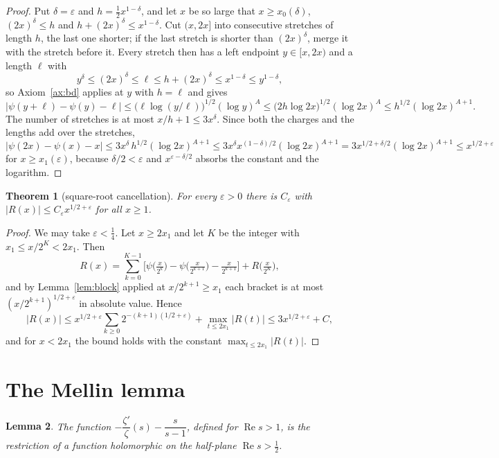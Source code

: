\documentclass[11pt]{article}
\newtheorem{theorem}{Theorem}[section]
\newtheorem{lemma}[theorem]{Lemma}
\theoremstyle{definition}
\theoremstyle{remark}
\newcommand{\Ree}{\operatorname{Re}}
\newcommand{\ps}{\psi}
\begin{document}
\begin{proof}
Put $\delta=\varepsilon$ and $h=\tfrac12x^{1-\delta}$, and let $x$ be so large that $x\ge x_0(\delta)$, $(2x)^{\delta}\le h$ and $h+(2x)^\delta\le x^{1-\delta}$. Cut $(x,2x]$ into consecutive stretches of length $h$, the last one shorter; if the last stretch is shorter than $(2x)^{\delta}$, merge it with the stretch before it. Every stretch then has a left endpoint $y\in[x,2x)$ and a length $\ell$ with
\[
y^{\delta}\le(2x)^{\delta}\le\ell\le h+(2x)^{\delta}\le x^{1-\delta}\le y^{1-\delta},
\]
so Axiom~\ref{ax:bd} applies at $y$ with $h=\ell$ and gives
\[
\big|\ps(y+\ell)-\ps(y)-\ell\big|\le\big(\ell\log(y/\ell)\big)^{1/2}(\log y)^{A}\le\big(2h\log 2x\big)^{1/2}(\log2x)^{A}\le h^{1/2}(\log2x)^{A+1}.
\]
The number of stretches is at most $x/h+1\le3x^{\delta}$. Since both the charges and the lengths add over the stretches,
\[
\big|\ps(2x)-\ps(x)-x\big|\le3x^{\delta}\,h^{1/2}(\log2x)^{A+1}\le3x^{\delta}x^{(1-\delta)/2}(\log2x)^{A+1}=3x^{1/2+\delta/2}(\log2x)^{A+1}\le x^{1/2+\varepsilon}
\]
for $x\ge x_1(\varepsilon)$, because $\delta/2<\varepsilon$ and $x^{\varepsilon-\delta/2}$ absorbs the constant and the logarithm.
\end{proof}

\begin{theorem}[square-root cancellation]\label{thm:koch}
For every $\varepsilon>0$ there is $C_\varepsilon$ with $|R(x)|\le C_\varepsilon x^{1/2+\varepsilon}$ for all $x\ge1$.
\end{theorem}

\begin{proof}
We may take $\varepsilon<\tfrac14$. Let $x\ge2x_1$ and let $K$ be the integer with $x_1\le x/2^{K}<2x_1$. Then
\[
R(x)=\sum_{k=0}^{K-1}\Big[\ps\big(\tfrac{x}{2^{k}}\big)-\ps\big(\tfrac{x}{2^{k+1}}\big)-\tfrac{x}{2^{k+1}}\Big]+R\big(\tfrac{x}{2^{K}}\big),
\]
and by Lemma~\ref{lem:block} applied at $x/2^{k+1}\ge x_1$ each bracket is at most $(x/2^{k+1})^{1/2+\varepsilon}$ in absolute value. Hence
\[
|R(x)|\le x^{1/2+\varepsilon}\sum_{k\ge0}2^{-(k+1)(1/2+\varepsilon)}+\max_{t\le2x_1}|R(t)|\le 3x^{1/2+\varepsilon}+C,
\]
and for $x<2x_1$ the bound holds with the constant $\max_{t\le2x_1}|R(t)|$.
\end{proof}

\section{The Mellin lemma}

\begin{lemma}\label{lem:mellin}
The function $-\dfrac{\zeta'}{\zeta}(s)-\dfrac{s}{s-1}$, defined for $\Ree s>1$, is the restriction of a function holomorphic on the half-plane $\Ree s>\tfrac12$.
\end{lemma}
\end{document}
